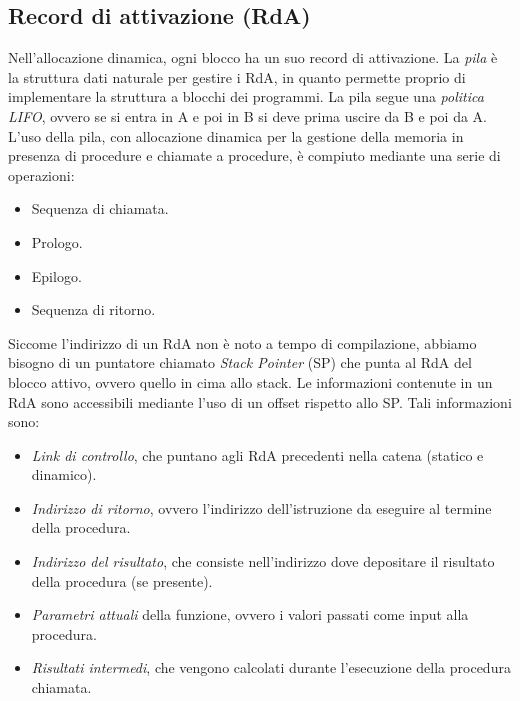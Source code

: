 \documentclass[a4paper,oneside,titlepage]{book}
\begin{document}
\subsection{Record di attivazione (RdA)}
Nell'allocazione dinamica, ogni blocco ha un suo record di attivazione. La \textit{pila} è la struttura dati naturale per gestire i RdA, in quanto permette proprio di implementare la struttura a blocchi dei programmi. La pila segue una \textit{politica LIFO}, ovvero se si entra in A e poi in B si deve prima uscire da B e poi da A. L'uso della pila, con allocazione dinamica per la gestione della memoria in presenza di procedure e chiamate a procedure, è compiuto mediante una serie di operazioni:
\begin{itemize}
	\item Sequenza di chiamata.
	\item Prologo.
	\item Epilogo.
	\item Sequenza di ritorno.
\end{itemize}
Siccome l'indirizzo di un RdA non è noto a tempo di compilazione, abbiamo bisogno di un puntatore chiamato \textit{Stack Pointer} (SP) che punta al RdA del blocco attivo, ovvero quello in cima allo stack. Le informazioni contenute in un RdA sono accessibili mediante l'uso di un offset rispetto allo SP. Tali informazioni sono:
\begin{itemize}
	\item \textit{Link di controllo}, che puntano agli RdA precedenti nella catena (statico e dinamico).
	\item \textit{Indirizzo di ritorno}, ovvero l'indirizzo dell'istruzione da eseguire al termine della procedura.
	\item \textit{Indirizzo del risultato}, che consiste nell'indirizzo dove depositare il risultato della procedura (se presente).
	\item \textit{Parametri attuali} della funzione, ovvero i valori passati come input alla procedura.
	\item \textit{Risultati intermedi}, che vengono calcolati durante l'esecuzione della procedura chiamata.		
\end{itemize}

\newpage
\end{document}

